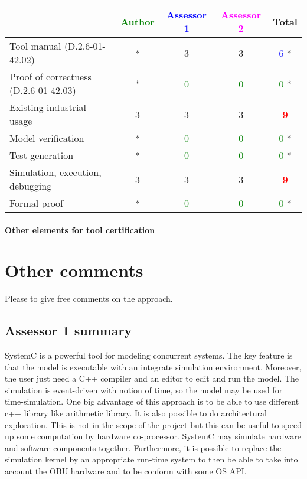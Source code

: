 \begin{tabular}{|l | c | c | c | c|}
\hline
& \textcolor{green}{Author} & \textcolor{blue}{Assessor 1} & \textcolor{magenta}{Assessor 2} & Total \\
\hline
Tool manual (D.2.6-01-42.02) & * &3 &3 & \textcolor{blue}{6} * \\
\hline
Proof of correctness (D.2.6-01-42.03) &*  & \textcolor{green}{0}   & \textcolor{green}{0}   & \textcolor{green}{0} *\\
\hline
Existing industrial usage &3 &3 &3 & \textcolor{red}{\textbf{9}} \\
\hline
Model verification & * & \textcolor{green}{0}   & \textcolor{green}{0}   & \textcolor{green}{0} *\\
\hline
Test generation & * & \textcolor{green}{0}   & \textcolor{green}{0}   & \textcolor{green}{0} *\\
\hline
Simulation, execution, debugging &3 &3 &3 & \textcolor{red}{\textbf{9}} \\
\hline
Formal proof &*  & \textcolor{green}{0}   & \textcolor{green}{0}   & \textcolor{green}{0} * \\
\hline
\end{tabular}

\paragraph{Other elements for tool certification}

\section{Other comments}
Please to give free comments on the approach.

\subsection{Assessor 1 summary}
SystemC is a powerful tool for modeling concurrent systems. The key
feature is that the model is executable with  an integrate simulation
environment. Moreover, the user just need a C++ compiler and an editor
to edit and run the model. 
The simulation is event-driven  with notion of time, so the model
may be used for time-simulation.
One big advantage of this approach is to be able to use different c++
library like arithmetic library. It is also possible to do
architectural exploration. This is not in the scope of the project but
this can be useful to speed up some computation by hardware
co-processor. SystemC may simulate hardware and software components together.
Furthermore, it is possible to replace the simulation kernel by an
appropriate run-time system  to then be able
to take into account the OBU hardware and to be conform with some OS
API.

